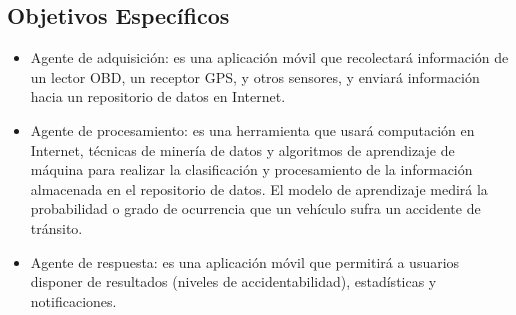 \documentclass[a4paper,10pt, oneside, titlepage]{article}
\begin{document}
	\subsection{Objetivos Específicos}
	\begin{itemize}
		\item Agente de adquisición: es una aplicación móvil que recolectará información de un lector OBD, un receptor GPS, y otros sensores, y enviará información hacia un repositorio de datos en Internet.
		\item Agente de procesamiento: es una herramienta que usará computación en Internet, técnicas de minería de datos y algoritmos de aprendizaje de máquina para realizar la clasificación y procesamiento de la información almacenada en el repositorio de datos. El modelo de aprendizaje medirá la probabilidad o grado de ocurrencia que un vehículo sufra un accidente de tránsito.
		\item Agente de respuesta: es una aplicación móvil que permitirá a usuarios disponer de resultados (niveles de accidentabilidad), estadísticas y notificaciones.
	\end{itemize}
	
\end{document}
